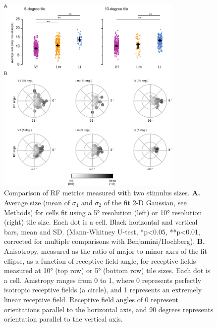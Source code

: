 \begin{figure}[hbt!]
\includegraphics[width=0.8\textwidth]{figures/supplemental/fig_s7_rf5_rf10_aggregate/fig_s7_rf5_rf10_aggregate.pdf}
    \centering
    \caption[Comparison of RF metrics]{Comparison of RF metrics measured with two stimulus sizes.
    \textbf{A.} Average size (mean of $\sigma_1$ and $\sigma_2$ of the fit 2-D Gaussian, see Methods) for cells fit using a \ang{5} resolution (left) or \ang{10} resolution (right) tile size. Each dot is a cell. Black horizontal and vertical bars, mean and SD. (Mann-Whitney U-test, *p<0.05, **p<0.01, corrected for multiple comparisons with Benjamini/Hochberg).
    \textbf{B.} Anisotropy, measured as the ratio of major to minor axes of the fit ellipse, as a function of receptive field angle, for receptive fields measured at \ang{10} (top row) or \ang{5} (bottom row) tile sizes. Each dot is a cell. Anistropy ranges from 0 to 1, where 0 represents perfectly isotropic receptive fields (a circle), and 1 represents an extremely linear receptive field. Receptive field angles of 0 represent orientations parallel to the horizontal axis, and 90 degrees represents orientation parallel to the vertical axis.
    \label{supfig:rf5_rf10_aggregate}}
\end{figure}


